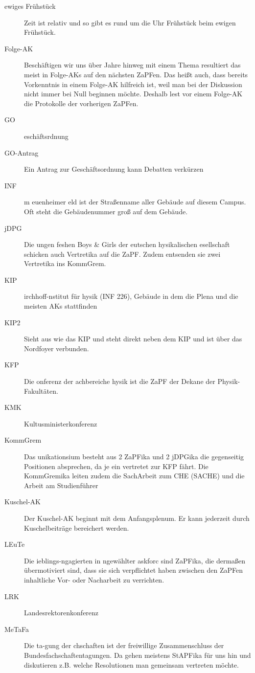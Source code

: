 \begin{description}
	\item[ewiges Frühstück] Zeit ist relativ und so gibt es rund um die Uhr Frühstück beim ewigen Frühstück.
	\item[Folge-AK] Beschäftigen wir uns über Jahre hinweg mit einem Thema resultiert das meist in Folge-AKs auf den nächsten ZaPFen. Das heißt auch, dass bereits Vorkenntnis in einem Folge-AK hilfreich ist, weil man bei der Diskussion nicht immer bei Null beginnen möchte. Deshalb lest vor einem Folge-AK die Protokolle der vorherigen ZaPFen.
	\item[GO] eschäftsrdnung
	\item[GO-Antrag] Ein Antrag zur Geschäftsordnung kann Debatten verkürzen
	\item[INF] m euenheimer eld ist der Straßenname aller Gebäude auf diesem Campus. Oft steht die Gebäudenummer groß auf dem Gebäude.
	\item[jDPG] Die ungen feshen Boys \& Girls der eutschen hysikalischen esellschaft schicken auch Vertretika auf die ZaPF. Zudem entsenden sie zwei Vertretika ins KommGrem.
	\item[KIP] irchhoff-nstitut für hysik (INF 226), Gebäude in dem die Plena und die meisten AKs stattfinden 
	\item[KIP2] Sieht aus wie das KIP und steht direkt neben dem KIP und ist über das Nordfoyer verbunden.
	\item[KFP] Die onferenz der achbereiche hysik ist die ZaPF der Dekane der Physik-Fakultäten.
	\item[KMK] Kultusministerkonferenz
	\item[KommGrem] Das unikationsium besteht aus 2 ZaPFika und 2 jDPGika die gegenseitig Positionen absprechen, da je ein vertretet zur KFP fährt. Die KommGremika leiten zudem die SachArbeit zum CHE (SACHE) und die Arbeit am Studienführer 
	\item[Kuschel-AK] Der Kuschel-AK beginnt mit dem Anfangsplenum. Er kann jederzeit durch Kuschelbeiträge bereichert werden.
	\item[LEuTe] Die ieblings-ngagierten in ngewählter askforc sind ZaPFika, die dermaßen übermotiviert sind, dass sie sich verpflichtet haben zwischen den ZaPFen inhaltliche Vor- oder Nacharbeit zu verrichten.
	\item[LRK] Landesrektorenkonferenz
	\item[MeTaFa] Die ta-gung der chschaften ist der freiwillige Zusammenschluss der Bundesfachschaftentagungen. Da gehen meistens StAPFika für uns hin und diskutieren z.B. welche Resolutionen man gemeinsam vertreten möchte.

\end{description}

